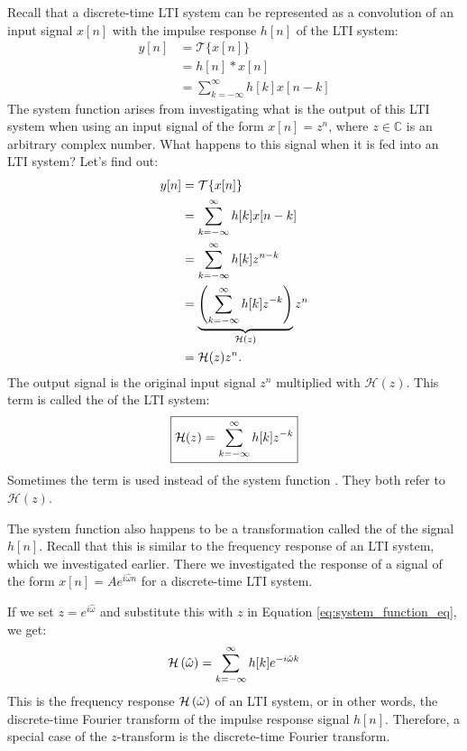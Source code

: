 Recall that a discrete-time LTI system can be represented as a
convolution of an input signal $x[n]$ with the impulse response $h[n]$
of the LTI system:
\begin{align}
  y[n] & = \mathcal{T}\{x[n]\}                   \\
       & = h[n]*x[n]                             \\
       & = \sum_{k=-\infty}^{\infty} h[k] x[n-k]
\end{align}
The system function arises from investigating what is the output of
this LTI system when using an input signal of the form $x[n]=z^n$,
where $z\in \mathbb{C}$ is an arbitrary complex number. What happens
to this signal when it is fed into an LTI system? Let's find out:
\begin{align}
  y[n] & = \mathcal{T}\{x[n]\}                                                        \\
       & = \sum_{k=-\infty}^{\infty} h[k] x[n-k]                                      \\
       & = \sum_{k=-\infty}^{\infty} h[k] z^{n-k}                                     \\
       & = \underbrace{\left(\sum_{k=-\infty}^{\infty} h[k] z^{-k}\right)}_{\mathcal{H}(z)} z^n \\
       & = \mathcal{H}(z) z^n.
\end{align}
The output signal is the original input signal $z^n$ multiplied with $\mathcal{H}(z)$. This term is called the \emph{} of the LTI system:
\begin{equation}
  \boxed{
    \mathcal{H}(z) = \sum_{k=-\infty}^{\infty} h[k] z^{-k}
  }
  \label{eq:system_function_eq}
\end{equation}
Sometimes the term \emph{}
is used instead of the system function .
They both refer to $\mathcal{H}(z)$.

The system function also happens to be a transformation called
the \emph{} of the signal $h[n]$. Recall
that this is similar to the frequency response of an LTI system, which
we investigated earlier. There we investigated the response of a
signal of the form $x[n]=A e^{i\hat{\omega}n}$ for a discrete-time LTI
system.

  If we set $z = e^{i\hat{\omega}}$ and substitute this with $z$ in
  Equation \ref{eq:system_function_eq}, we get:
  \begin{equation}
    \mathcal{H}\left(\hat{\omega}\right) = \sum_{k=-\infty}^{\infty} h[k] e^{-i\hat{\omega}k}
  \end{equation}
  This is the frequency response $\mathcal{H}\left(\hat{\omega}\right)$ of an LTI system, or in other
  words, the discrete-time Fourier transform of the impulse response
  signal $h[n]$. Therefore, a special case of the $z$-transform is the
  discrete-time Fourier transform.

